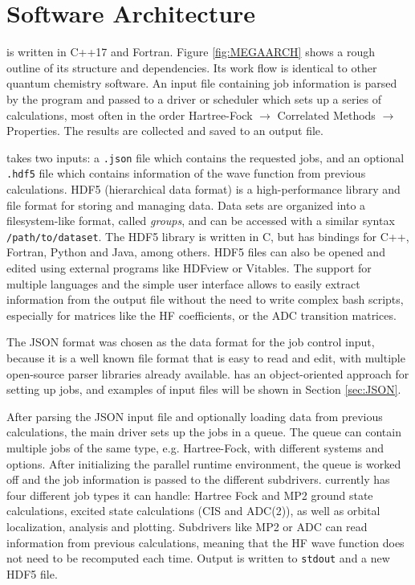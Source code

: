 \section{Software Architecture}

\mchem{} is written in C++17 and Fortran. Figure \ref{fig:MEGAARCH} shows a rough outline of its structure and dependencies. Its work flow is identical to other quantum chemistry software. An input file containing job information is parsed by the program and passed to  a driver or scheduler which sets up a series of calculations, most often in the order Hartree-Fock $\rightarrow$ Correlated Methods $\rightarrow$ Properties. The results are collected and saved to an output file.

\mchem{} takes two inputs: a \texttt{.json} file which contains the requested jobs, and an optional \texttt{.hdf5} file which contains information of the wave function from previous calculations. HDF5 (hierarchical data format) is a high-performance library and file format for storing and managing data. Data sets are organized into a filesystem-like format, called \emph{groups}, and can be accessed with a similar syntax \texttt{/path/to/dataset}. The  HDF5 library is written in C, but has bindings for C++, Fortran, Python and Java, among others. HDF5 files can also be opened and edited using external programs like HDFview or Vitables. The support for multiple languages and the simple user interface allows to easily extract information from the output file without the need to write complex bash scripts, especially for matrices like the HF coefficients, or the ADC transition matrices.  

The JSON format was chosen as the data format for the job control input, because it is a well known file format that is easy to read and edit, with multiple open-source parser libraries already available. \mchem{} has an object-oriented approach for setting up jobs, and examples of input files will be shown in Section \ref{sec:JSON}.

After parsing the JSON input file and optionally loading data from previous calculations, the main driver sets up the jobs in a queue. The queue can contain multiple jobs of the same type, e.g. Hartree-Fock, with different systems and options. After initializing the parallel runtime environment, the queue is worked off and the job information is passed to the different subdrivers. \mchem{} currently has four different job types it can handle: Hartree Fock and MP2 ground state calculations, excited state calculations (CIS and ADC(2)), as well as orbital localization, analysis and plotting. Subdrivers like MP2 or ADC can read information from previous calculations, meaning that the HF wave function does not need to be recomputed each time. Output is written to \texttt{stdout} and a new HDF5 file. 

